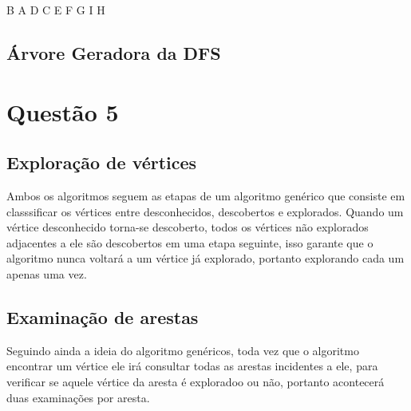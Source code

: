 \documentclass{article}
\begin{document}
B A D C E F G I H

\subsection{Árvore Geradora da DFS}


\newpage

\section{Questão 5}

\subsection{Exploração de vértices}

Ambos os algoritmos seguem as etapas de um algoritmo genérico que consiste em classsificar os vértices entre desconhecidos, descobertos e explorados. Quando um vértice desconhecido torna-se descoberto, todos os vértices não explorados adjacentes a ele são descobertos em uma etapa seguinte, isso garante que o algoritmo nunca voltará a um vértice já explorado, portanto explorando cada um apenas uma vez.

\subsection{Examinação de arestas}

Seguindo ainda a ideia do algoritmo genéricos, toda vez que o algoritmo encontrar um vértice ele irá consultar todas as arestas incidentes a ele, para verificar se aquele vértice da aresta é exploradoo ou não, portanto acontecerá duas examinações por aresta.
\end{document}
